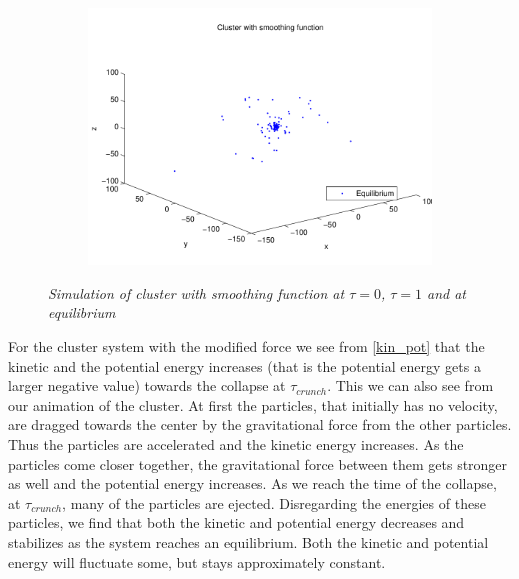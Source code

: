 \documentclass[a4paper,12pt, english]{article}
\begin{document}
\begin{figure}[H]
        \begin{subfigure}[b]{0.6\textwidth}
        \includegraphics[scale=0.5]{CLUSTER_eq.pdf}
        \end{subfigure}
        
		\label{fig:cluster_smooth}        
		\caption{\textit{Simulation of cluster with smoothing function at $\tau = 0$, $\tau = 1$ and at equilibrium}}
\end{figure}

For the cluster system with the modified force we see from \ref{kin_pot} that the kinetic and the potential energy increases (that is the potential energy gets a larger negative value) towards the collapse at $\tau_{crunch}$. This we can also see from our animation of the cluster. At first the particles, that initially has no velocity, are dragged towards the center by the gravitational force from the other particles. Thus the particles are accelerated and the kinetic energy increases. As the particles come closer together, the gravitational force between them gets stronger as well and the potential energy increases. As we reach the time of the collapse, at $\tau_{crunch}$, many of the particles are ejected. Disregarding the energies of these particles, we find that both the kinetic and potential energy decreases and stabilizes as the system reaches an equilibrium. Both the kinetic and potential energy will fluctuate some, but stays approximately constant.    
\end{document}
